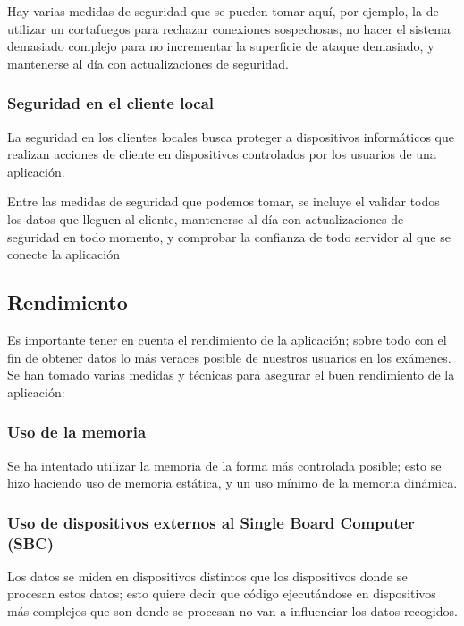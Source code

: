 \documentclass[12pt,a4paper,twoside,openright]{book}
\begin{document}
Hay varias medidas de seguridad que se pueden tomar aquí, por ejemplo, la de utilizar un cortafuegos para rechazar conexiones sospechosas, no hacer el sistema demasiado complejo para no incrementar la superficie de ataque demasiado, y mantenerse al día con actualizaciones de seguridad.

\subsubsection{Seguridad en el cliente local}

La seguridad en los clientes locales busca proteger a dispositivos informáticos que realizan acciones de cliente en dispositivos controlados por los usuarios de una aplicación.

Entre las medidas de seguridad que podemos tomar, se incluye el validar todos los datos que lleguen al cliente, mantenerse al día con actualizaciones de seguridad en todo momento, y comprobar la confianza de todo servidor al que se conecte la aplicación

\subsection{Rendimiento}

Es importante tener en cuenta el rendimiento de la aplicación; sobre todo con el fin de obtener datos lo más veraces posible de nuestros usuarios en los exámenes. Se han tomado varias medidas y técnicas para asegurar el buen rendimiento de la aplicación:

\subsubsection{Uso de la memoria}

Se ha intentado utilizar la memoria de la forma más controlada posible; esto se hizo haciendo uso de memoria estática, y un uso mínimo de la memoria dinámica.

\subsubsection{Uso de dispositivos externos al Single Board Computer (SBC)}

Los datos se miden en dispositivos distintos que los dispositivos donde se procesan estos datos; esto quiere decir que código ejecutándose en dispositivos más complejos que son donde se procesan no van a influenciar los datos recogidos.
\end{document}
